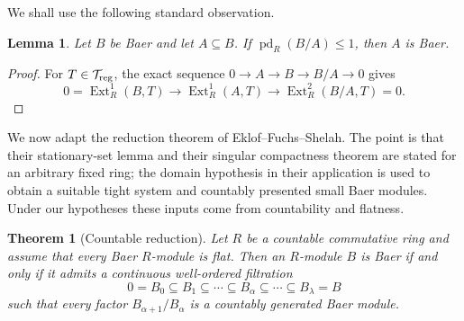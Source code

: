 \documentclass[11pt]{article}
\newtheorem{theorem}{Theorem}[section]
\newtheorem{lemma}[lemma]{Lemma}
\theoremstyle{definition}
\theoremstyle{remark}
\newcommand{\pd}{\operatorname{pd}}
\newcommand{\Ext}{\operatorname{Ext}}
\newcommand{\Tors}{\mathcal T_{\rm reg}}
\begin{document}
We shall use the following standard observation.

\begin{lemma}\label{lem:tight-baer}
Let $B$ be Baer and let $A\subseteq B$.  If $\pd_R(B/A)\le1$, then $A$ is
Baer.
\end{lemma}

\begin{proof}
For $T\in\Tors$, the exact sequence $0\to A\to B\to B/A\to0$ gives
\[
 0=\Ext_R^1(B,T)\longrightarrow \Ext_R^1(A,T)
 \longrightarrow \Ext_R^2(B/A,T)=0.
\]
\end{proof}

We now adapt the reduction theorem of Eklof--Fuchs--Shelah.  The point is that
their stationary-set lemma and their singular compactness theorem are stated
for an arbitrary fixed ring; the domain hypothesis in their application is
used to obtain a suitable tight system and countably presented small Baer
modules.  Under our hypotheses these inputs come from countability and
flatness.

\begin{theorem}[Countable reduction]\label{thm:reduction}
Let $R$ be a countable commutative ring and assume that every Baer $R$-module
is flat.  Then an $R$-module $B$ is Baer if and only if it admits a continuous
well-ordered filtration
\[
 0=B_0\subseteq B_1\subseteq\cdots\subseteq B_\alpha
 \subseteq\cdots\subseteq B_\lambda=B
\]
such that every factor $B_{\alpha+1}/B_\alpha$ is a countably generated Baer
module.
\end{theorem}
\end{document}
